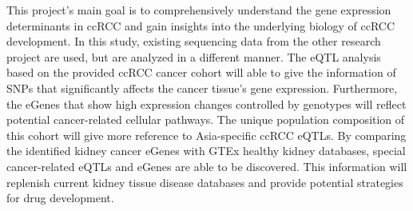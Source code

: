 This project’s main goal is to comprehensively understand the gene expression determinants in ccRCC and gain insights into the underlying biology of ccRCC development. In this study, existing sequencing data from the other research project are used, but are analyzed in a different manner. The eQTL analysis based on the provided ccRCC cancer cohort will able to give the information of SNPs that significantly affects the cancer tissue's gene expression. Furthermore, the eGenes that show high expression changes controlled by genotypes will reflect potential cancer-related cellular pathways. The unique population composition of this cohort will give more reference to Asia-specific ccRCC eQTLs. By comparing the identified kidney cancer eGenes with GTEx healthy kidney databases, special cancer-related eQTLs and eGenes are able to be discovered. This information will replenish current kidney tissue disease databases and provide potential strategies for drug development.
